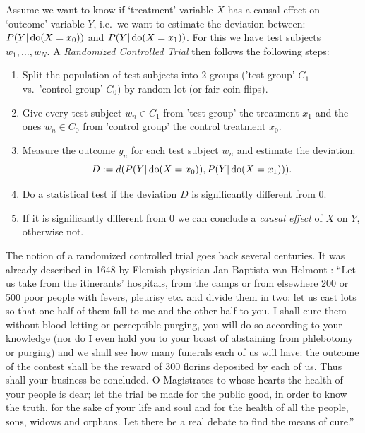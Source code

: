 \begin{Prn}\label{prn:rct}
 Assume we want to know if `treatment' variable $X$ has a causal effect on `outcome' variable $Y$, i.e.\ we want to estimate the deviation between:
$ P(Y|\operatorname{do}(X=x_0))$ and  $P(Y|\operatorname{do}(X=x_1))$. For this we have test subjects $w_1,\dots,w_N$.
A \emph{Randomized Controlled Trial} then follows the following steps:
\begin{enumerate}
    \item Split the population of test subjects into 2 groups ('test group' $C_1$ vs.\ 'control group' $C_0$) by random lot (or fair coin flips).
    \item Give every test subject $w_n \in C_1$ from 'test group' the treatment $x_1$ and the ones  $w_n \in C_0$ from 'control group' the control treatment $x_0$.
    \item Measure the outcome $y_n$ for each test subject $w_n$ and estimate the deviation: \[D:=d(P(Y|\operatorname{do}(X=x_0)),P(Y|\operatorname{do}(X=x_1))).\]
    \item Do a statistical test if the deviation $D$ is significantly different from $0$. 
    \item If it is significantly different from 0 we can conclude a \emph{causal effect} of $X$ on $Y$, otherwise not.
\end{enumerate}
\end{Prn}

\begin{Rem}
  The notion of a randomized controlled trial goes back several centuries. It was already described in 1648 by Flemish physician Jan Baptista van Helmont \cite{vanHelmont1648}:
  ``Let us take from the itinerants' hospitals, from the camps or from elsewhere 200 or 500 poor people with fevers, pleurisy etc. and divide them in two: let us cast lots so that one half of them fall to me and the other half to you. I shall cure them without blood-letting or perceptible purging, you will do so according to your knowledge (nor do I even hold you to your boast of abstaining from phlebotomy or purging) and we shall see how many funerals each of us will have: the outcome of the contest shall be the reward of 300 florins deposited by each of us. Thus shall your business be concluded. O Magistrates to whose hearts the health of your people is dear; let the trial be made for the public good, in order to know the truth, for the sake of your life and soul and for the health of all the people, sons, widows and orphans. Let there be a real debate to find the means of cure.''
\end{Rem}

